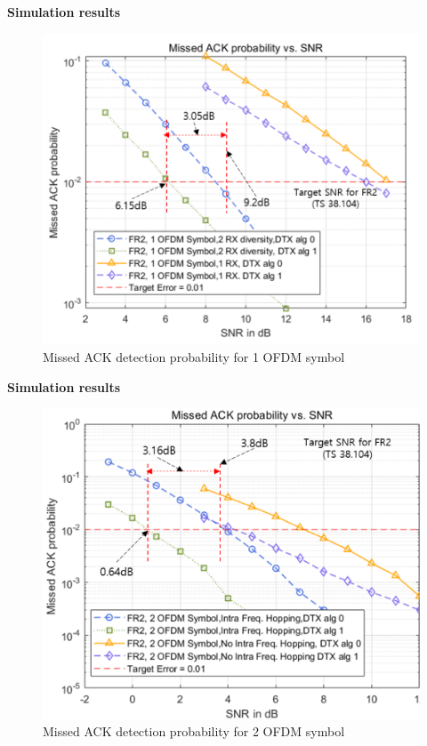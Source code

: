 \documentclass{beamer}
\begin{document}
\begin{frame}{\textbf{Simulation results}}
\begin{figure}
    \centering
    \includegraphics[scale=0.3]{OFDM1.png}
    \caption{ Missed ACK detection probability for 1 OFDM symbol}
\end{figure}
\end{frame}

\begin{frame}{\textbf{Simulation results}}
\begin{figure}
    \centering
    \includegraphics[scale=0.3]{OFDM2.png}
    \caption{Missed ACK detection probability for 2 OFDM symbol}
\end{figure}
\end{frame}
\end{document}
